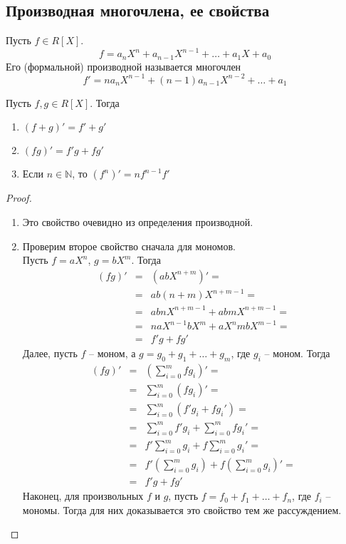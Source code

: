 
\begin{normalsize}
\section{Производная многочлена, ее свойства}

\begin{conj} Пусть $f \in R[X]$.
    \[f = a_n X^n + a_{n-1} X^{n - 1} + \dots + a_1 X + a_0\]
    Его (формальной) производной называется многочлен
    \[f' = n a_n X^{n-1} + (n - 1) a_{n-1} X^{n-2} + \dots + a_1\]
\end{conj}

\begin{theorem-non}
    Пусть $f, g \in R[X]$. Тогда
\begin{enumerate}
    \item $(f + g)' = f' + g'$
    \item $(fg)' = f'g + fg'$
    \item Если $n \in \mathbb{N}$, то $(f^n)' = n f^{n-1} f'$
\end{enumerate}
\end{theorem-non}
\begin{proof} $ $

    \begin{enumerate}
        \item Это свойство очевидно из определения производной.
        \item Проверим второе свойство сначала для мономов.\\
        Пусть $f = a X^n$, $g = b X^m$. Тогда
        \begin{eqnarray*}
            (fg)' &=& (abX^{n+m})' = \\
            &=& ab(n + m)X^{n + m - 1} = \\
            &=& abnX^{n + m - 1} + abmX^{n + m - 1} = \\
            &=& naX^{n-1}bX^m + aX^nmbX^{m-1} = \\
            &=& f'g + fg'
        \end{eqnarray*}
        Далее, пусть $f$ -- моном, а $g = g_0 + g_1 + \dots + g_m$,
        где $g_i$ -- моном. Тогда
        \begin{eqnarray*}
            (fg)' &=& (\sum_{i = 0}^m fg_i)' = \\
            &=& \sum_{i = 0}^m(fg_i)' = \\
            &=& \sum_{i = 0}^m(f'g_i + fg_i') = \\
            &=& \sum_{i = 0}^m f'g_i + \sum_{i = 0}^m fg_i' = \\
            &=& f' \sum_{i = 0}^m g_i + f \sum_{i = 0}^m g_i' = \\
            &=& f' (\sum_{i = 0}^m g_i) + f (\sum_{i = 0}^m g_i)' = \\
            &=& f' g + f g'
        \end{eqnarray*}
        Наконец, для произвольных $f$ и $g$, пусть 
        $f = f_0 + f_1 + \dots + f_n$, где $f_i$ -- мономы. Тогда
        для них доказывается это свойство тем же рассуждением.


\end{enumerate}
\end{proof}
\end{normalsize}
